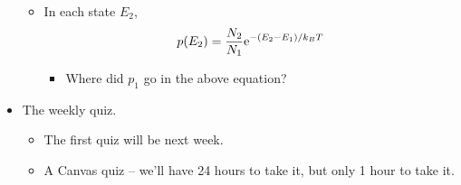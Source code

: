 \documentclass[../notes.tex]{subfiles}
\begin{document}
\begin{itemize}
\begin{itemize}
        \item In each state $E_2$,
        \begin{equation*}
            p(E_2) = \frac{N_2}{N_1}\e[-(E_2-E_1)/k_BT]
        \end{equation*}
        \begin{itemize}
            \item Where did $p_1$ go in the above equation?
        \end{itemize}
    \end{itemize}
    \item The weekly quiz.
    \begin{itemize}
        \item The first quiz will be next week.
        \item A Canvas quiz -- we'll have 24 hours to take it, but only 1 hour to take it.
    \end{itemize}
\end{itemize}
\end{document}
